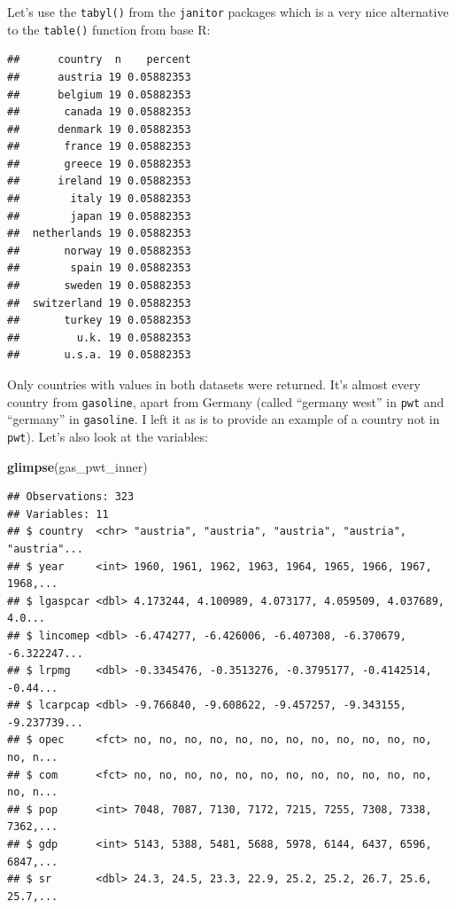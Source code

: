 \documentclass[]{gitbook}
\newenvironment{Shaded}{\begin{snugshade}}{\end{snugshade}}
\newcommand{\KeywordTok}[1]{\textcolor[rgb]{0.13,0.29,0.53}{\textbf{#1}}}
\newcommand{\NormalTok}[1]{#1}
\newcommand{\OperatorTok}[1]{\textcolor[rgb]{0.81,0.36,0.00}{\textbf{#1}}}
\newcommand{\StringTok}[1]{\textcolor[rgb]{0.31,0.60,0.02}{#1}}
\theoremstyle{definition}
\theoremstyle{definition}
\theoremstyle{definition}
\theoremstyle{remark}
\begin{document}
Let's use the \texttt{tabyl()} from the \texttt{janitor} packages which
is a very nice alternative to the \texttt{table()} function from base R:

\begin{Shaded}
\end{Shaded}

\begin{verbatim}
##      country  n    percent
##      austria 19 0.05882353
##      belgium 19 0.05882353
##       canada 19 0.05882353
##      denmark 19 0.05882353
##       france 19 0.05882353
##       greece 19 0.05882353
##      ireland 19 0.05882353
##        italy 19 0.05882353
##        japan 19 0.05882353
##  netherlands 19 0.05882353
##       norway 19 0.05882353
##        spain 19 0.05882353
##       sweden 19 0.05882353
##  switzerland 19 0.05882353
##       turkey 19 0.05882353
##         u.k. 19 0.05882353
##       u.s.a. 19 0.05882353
\end{verbatim}

Only countries with values in both datasets were returned. It's almost
every country from \texttt{gasoline}, apart from Germany (called
``germany west'' in \texttt{pwt} and ``germany'' in \texttt{gasoline}. I
left it as is to provide an example of a country not in \texttt{pwt}).
Let's also look at the variables:

\begin{Shaded}
\begin{Highlighting}[]
\KeywordTok{glimpse}\NormalTok{(gas_pwt_inner)}
\end{Highlighting}
\end{Shaded}

\begin{verbatim}
## Observations: 323
## Variables: 11
## $ country  <chr> "austria", "austria", "austria", "austria", "austria"...
## $ year     <int> 1960, 1961, 1962, 1963, 1964, 1965, 1966, 1967, 1968,...
## $ lgaspcar <dbl> 4.173244, 4.100989, 4.073177, 4.059509, 4.037689, 4.0...
## $ lincomep <dbl> -6.474277, -6.426006, -6.407308, -6.370679, -6.322247...
## $ lrpmg    <dbl> -0.3345476, -0.3513276, -0.3795177, -0.4142514, -0.44...
## $ lcarpcap <dbl> -9.766840, -9.608622, -9.457257, -9.343155, -9.237739...
## $ opec     <fct> no, no, no, no, no, no, no, no, no, no, no, no, no, n...
## $ com      <fct> no, no, no, no, no, no, no, no, no, no, no, no, no, n...
## $ pop      <int> 7048, 7087, 7130, 7172, 7215, 7255, 7308, 7338, 7362,...
## $ gdp      <int> 5143, 5388, 5481, 5688, 5978, 6144, 6437, 6596, 6847,...
## $ sr       <dbl> 24.3, 24.5, 23.3, 22.9, 25.2, 25.2, 26.7, 25.6, 25.7,...
\end{verbatim}
\end{document}
